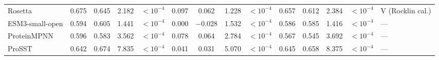 \begin{table}[H]
{\begin{tabular}{lccccccccccccl}
Rosetta & 0.675 & 0.645 & 2.182 & $<10^{-4}$ & 0.097 & 0.062 & 1.228 & $<10^{-4}$ & 0.657 & 0.612 & 2.384 & $<10^{-4}$ & V (Rocklin cal.) \\
ESM3-small-open & 0.594 & 0.605 & 1.441 & $<10^{-4}$ & 0.000 & $-$0.028 & 1.532 & $<10^{-4}$ & 0.586 & 0.585 & 1.416 & $<10^{-4}$ & --- \\
ProteinMPNN & 0.596 & 0.583 & 3.562 & $<10^{-4}$ & 0.078 & 0.064 & 2.784 & $<10^{-4}$ & 0.567 & 0.545 & 3.692 & $<10^{-4}$ & --- \\
ProSST & 0.642 & 0.674 & 7.835 & $<10^{-4}$ & 0.041 & 0.031 & 5.070 & $<10^{-4}$ & 0.645 & 0.658 & 8.375 & $<10^{-4}$ & --- \\
\bottomrule
\end{tabular}
}
\end{table}

\begin{table}[H]
\centering
\caption{\textbf{All-Model Comparison on Full MegaScale Split Test Set: Double Mutants (Epistatic vs. Additive Readout)}. Mean per-domain Spearman's $\rho$, Pearson's $r$, and raw RMSE (kcal/mol) across the 20 double-mutant test domains of \texttt{mega\_splits} ($n=18{,}574$ doubles). ESM-MSR uses the Tobit observation link; ESM-MSR (unlinked) reports raw latent RMSE only. One-sided $p$-values test $H_1\colon \rho_{\text{ESM-MSR}} > \rho_{\text{model}}$ via paired domain-cluster $\times$ seed bootstrap ($B=10{,}000$; uncorrected).}
\label{tab:si_megasplits_doubles}
\end{table}
